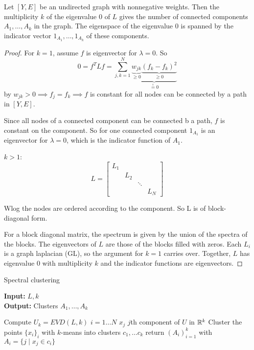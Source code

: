 \begin{theorem}\label{thm:2.23}
    Let $[Y,E]$ be an undirected graph with nonnegative weights. Then the multiplicity $k$ of 
    the eigenvalue $0$ of $L$ gives the number of connected components $A_1,\dots,A_k$ in the graph.
    The eigenspace of the eigenvalue $0$ is spanned by the indicator vector $1_{A_1},\dots,1_{A_k}$
    of these components.
\end{theorem}

\begin{proof}
    For $k=1$, assume $f$ is eigenvector for $\lambda=0$. So 
    \[0=f^T L f = \sum_{j,k=1}^N \underbrace{\underbrace{w_{jk}}_{\geq 0}\underbrace{(f_k-f_k)^2}_{\geq 0}}_{\stackrel{!}{=}0}\]
    by $w_{jk}>0\implies f_{j}=f_k\implies f$ is constant for all nodes can be connected by a path in $[Y,E]$.
    
    Since all nodes of a connected component can be connected b a path, $f$ is constant on the component. 
    So for one connected component $1_{A_1}$ is an eigenvector for $\lambda=0$, which is 
    the indicator function of $A_1$.

    $k>1$:
    \[L=\begin{bmatrix}
        L_1 & &&\\
        & L_2 &&\\
        &&\ddots &\\
        &&&L_N
    \end{bmatrix}\]

    Wlog the nodes are ordered according to the component. So L is of block-diagonal form.

    For a block diagonal matrix, the spectrum is given by the 
    union of the spectra of the blocks. The eigenvectors of $L$ are those of the blocks 
    filled with zeros. Each $L_i$ is a graph laplacian (GL), so the argument for $k=1$ carries over.
    Together, $L$ has eigenvalue $0$ with multiplicity $k$ and the indicator functions are eigenvectors. 

\end{proof}
\begin{algorithm}[H] 
    \caption{Spectral clustering}\label{alg:spec_clust}
 \textbf{Input:}  $L,k$\\
 \textbf{Output:} Clusters $A_1,\dots,A_k$
 \begin{algorithmic}
    \State Compute $U_k=EVD(L,k)$
    \For $i=1\dots N$
        \State $x_j$ $j$th component of $U$ in $\mathbb{R}^k$
    \EndFor
    \State Cluster the points $\{x_i\}_i$ with $k$-means into clusters $c_1,\dots c_k$
    \State return $(A_i)_{i=1}^k$ with $A_i=\{j\mid x_j\in c_i\}$
 \end{algorithmic}
\end{algorithm}


